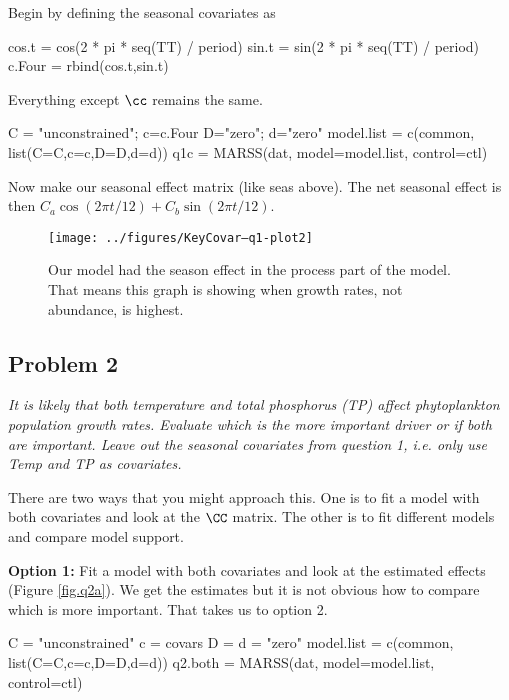 Begin by defining the seasonal covariates as
\begin{Schunk}
\begin{Sinput}
 cos.t = cos(2 * pi * seq(TT) / period)
 sin.t = sin(2 * pi * seq(TT) / period)
 c.Four = rbind(cos.t,sin.t)
\end{Sinput}
\end{Schunk}
Everything except $\cc$ remains the same.
\begin{Schunk}
\begin{Sinput}
 C = "unconstrained"; c=c.Four
 D="zero"; d="zero"
 model.list = c(common, list(C=C,c=c,D=D,d=d))
 q1c = MARSS(dat, model=model.list, control=ctl)
\end{Sinput}
\end{Schunk}
Now make our seasonal effect matrix (like seas above). The net seasonal effect is then $C_a \cos(2 \pi t/12) + C_b \sin(2 \pi t/12)$.
\begin{Schunk}
\end{Schunk}

\begin{figure}[htp]
\begin{center}
\texttt{[image: ../figures/KeyCovar--q1-plot2]}
\end{center}
\caption{Our model had the season effect in the process part of the model.  That means this graph is showing when growth rates, not abundance, is highest.}
\end{figure}

\clearpage

\subsection*{Problem 2}
\textit{It is likely that both temperature and total phosphorus (TP) affect phytoplankton population growth rates. Evaluate which is the more important driver or if both are important. Leave out the seasonal covariates from question 1, i.e. only use Temp and TP as covariates.}

\bigskip
There are two ways that you might approach this. One is to fit a model with both covariates and look at the $\CC$ matrix.  The other is to fit different models and compare model support.

\bigskip
{\bf Option 1:}  Fit a model with both covariates and look at the estimated effects (Figure \ref{fig.q2a}).  We get the estimates but it is not obvious how to compare which is more important.  That takes us to option 2.
\begin{Schunk}
\begin{Sinput}
 C = "unconstrained"
 c = covars
 D = d = "zero"
 model.list = c(common, list(C=C,c=c,D=D,d=d))
 q2.both = MARSS(dat, model=model.list, control=ctl)
\end{Sinput}
\end{Schunk}

